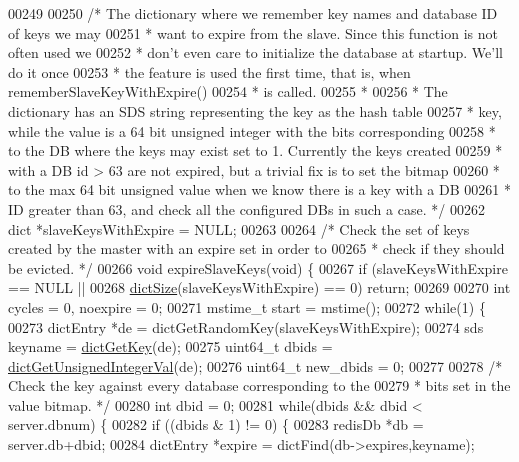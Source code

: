 \begin{DoxyCode}
{{{{{00249 
00250 \textcolor{comment}{/* The dictionary where we remember key names and database ID of keys we may}
00251 \textcolor{comment}{ * want to expire from the slave. Since this function is not often used we}
00252 \textcolor{comment}{ * don't even care to initialize the database at startup. We'll do it once}
00253 \textcolor{comment}{ * the feature is used the first time, that is, when rememberSlaveKeyWithExpire()}
00254 \textcolor{comment}{ * is called.}
00255 \textcolor{comment}{ *}
00256 \textcolor{comment}{ * The dictionary has an SDS string representing the key as the hash table}
00257 \textcolor{comment}{ * key, while the value is a 64 bit unsigned integer with the bits corresponding}
00258 \textcolor{comment}{ * to the DB where the keys may exist set to 1. Currently the keys created}
00259 \textcolor{comment}{ * with a DB id > 63 are not expired, but a trivial fix is to set the bitmap}
00260 \textcolor{comment}{ * to the max 64 bit unsigned value when we know there is a key with a DB}
00261 \textcolor{comment}{ * ID greater than 63, and check all the configured DBs in such a case. */}
00262 dict *slaveKeysWithExpire = NULL;
00263 
00264 \textcolor{comment}{/* Check the set of keys created by the master with an expire set in order to}
00265 \textcolor{comment}{ * check if they should be evicted. */}
00266 \textcolor{keywordtype}{void} expireSlaveKeys(\textcolor{keywordtype}{void}) \{
00267     \textcolor{keywordflow}{if} (slaveKeysWithExpire == NULL ||
00268         \hyperlink{dict_8h_af193430dd3d5579a52b194512f72c1f0}{dictSize}(slaveKeysWithExpire) == 0) \textcolor{keywordflow}{return};
00269 
00270     \textcolor{keywordtype}{int} cycles = 0, noexpire = 0;
00271     mstime\_t start = mstime();
00272     \textcolor{keywordflow}{while}(1) \{
00273         dictEntry *de = dictGetRandomKey(slaveKeysWithExpire);
00274         sds keyname = \hyperlink{dict_8h_a3271c334309904a3086deca94f96e46e}{dictGetKey}(de);
00275         uint64\_t dbids = \hyperlink{dict_8h_ad65abe818fa141e537800699668a7f09}{dictGetUnsignedIntegerVal}(de);
00276         uint64\_t new\_dbids = 0;
00277 
00278         \textcolor{comment}{/* Check the key against every database corresponding to the}
00279 \textcolor{comment}{         * bits set in the value bitmap. */}
00280         \textcolor{keywordtype}{int} dbid = 0;
00281         \textcolor{keywordflow}{while}(dbids && dbid < server.dbnum) \{
00282             \textcolor{keywordflow}{if} ((dbids & 1) != 0) \{
00283                 redisDb *db = server.db+dbid;
00284                 dictEntry *expire = dictFind(db->expires,keyname);
}}}}}
\end{DoxyCode}
